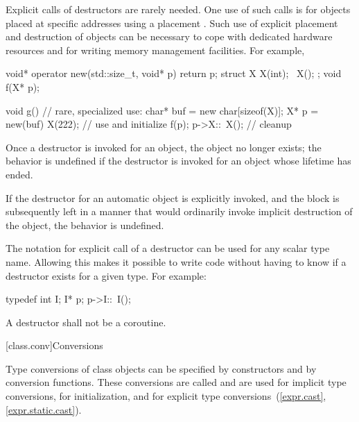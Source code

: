 \pnum
\begin{note}
%
Explicit calls of destructors are rarely needed.
One use of such calls is for objects placed at specific
addresses using a placement
.
Such use of explicit placement and destruction of objects can be necessary
to cope with dedicated hardware resources and for writing memory management
facilities.
For example,
\begin{codeblock}
void* operator new(std::size_t, void* p) { return p; }
struct X {
  X(int);
  ~X();
};
void f(X* p);

void g() {                      // rare, specialized use:
  char* buf = new char[sizeof(X)];
  X* p = new(buf) X(222);       // use  and initialize
  f(p);
  p->X::~X();                   // cleanup
}
\end{codeblock}
\end{note}

\pnum
Once a destructor is invoked for an object, the object no longer exists;
the behavior is undefined if the destructor is invoked
for an object whose lifetime has ended.
\begin{example}
If the destructor for an automatic object is explicitly invoked,
and the block is subsequently left in a manner that would ordinarily
invoke implicit destruction of the object, the behavior is undefined.
\end{example}

\pnum
\begin{note}
%
The notation for explicit call of a destructor can be used for any scalar type
name.
Allowing this makes it possible to write code without having to know if a
destructor exists for a given type.
For example:
\begin{codeblock}
typedef int I;
I* p;
p->I::~I();
\end{codeblock}
\end{note}

\pnum
A destructor shall not be a coroutine.

[class.conv]{Conversions}

\pnum
{}%
%
%
%
Type conversions of class objects can be specified by constructors and
by conversion functions.
These conversions are called
and are used for implicit type conversions,
for initialization,
and for explicit type conversions~(\ref{expr.cast}, \ref{expr.static.cast}).


